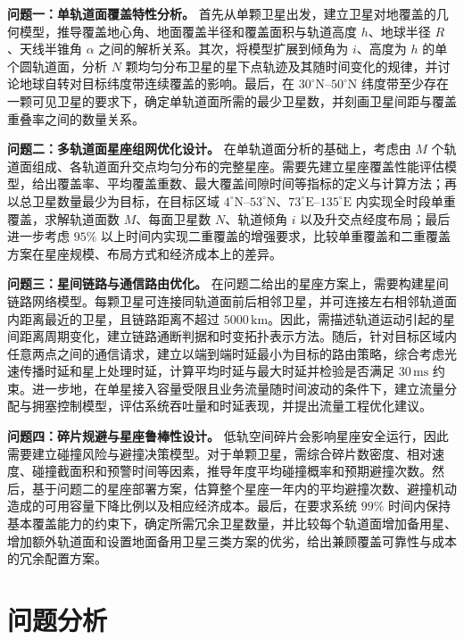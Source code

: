 \documentclass[withoutpreface,bwprint]{cumcmthesis} %
\begin{document}
\textbf{问题一：单轨道面覆盖特性分析。}
首先从单颗卫星出发，建立卫星对地覆盖的几何模型，推导覆盖地心角、地面覆盖半径和覆盖面积与轨道高度 $h$、地球半径 $R$、天线半锥角 $\alpha$ 之间的解析关系。其次，将模型扩展到倾角为 $i$、高度为 $h$ 的单个圆轨道面，分析 $N$ 颗均匀分布卫星的星下点轨迹及其随时间变化的规律，并讨论地球自转对目标纬度带连续覆盖的影响。最后，在 $30^\circ\mathrm{N}$--$50^\circ\mathrm{N}$ 纬度带至少存在一颗可见卫星的要求下，确定单轨道面所需的最少卫星数，并刻画卫星间距与覆盖重叠率之间的数量关系。\par

\textbf{问题二：多轨道面星座组网优化设计。}
在单轨道面分析的基础上，考虑由 $M$ 个轨道面组成、各轨道面升交点均匀分布的完整星座。需要先建立星座覆盖性能评估模型，给出覆盖率、平均覆盖重数、最大覆盖间隙时间等指标的定义与计算方法；再以总卫星数量最少为目标，在目标区域 $4^\circ\mathrm{N}$--$53^\circ\mathrm{N}$、$73^\circ\mathrm{E}$--$135^\circ\mathrm{E}$ 内实现全时段单重覆盖，求解轨道面数 $M$、每面卫星数 $N$、轨道倾角 $i$ 以及升交点经度布局；最后进一步考虑 $95\%$ 以上时间内实现二重覆盖的增强要求，比较单重覆盖和二重覆盖方案在星座规模、布局方式和经济成本上的差异。\par

\textbf{问题三：星间链路与通信路由优化。}
在问题二给出的星座方案上，需要构建星间链路网络模型。每颗卫星可连接同轨道面前后相邻卫星，并可连接左右相邻轨道面内距离最近的卫星，且链路距离不超过 $5000\,\mathrm{km}$。因此，需描述轨道运动引起的星间距离周期变化，建立链路通断判据和时变拓扑表示方法。随后，针对目标区域内任意两点之间的通信请求，建立以端到端时延最小为目标的路由策略，综合考虑光速传播时延和星上处理时延，计算平均时延与最大时延并检验是否满足 $30\,\mathrm{ms}$ 约束。进一步地，在单星接入容量受限且业务流量随时间波动的条件下，建立流量分配与拥塞控制模型，评估系统吞吐量和时延表现，并提出流量工程优化建议。\par

\textbf{问题四：碎片规避与星座鲁棒性设计。}
低轨空间碎片会影响星座安全运行，因此需要建立碰撞风险与避撞决策模型。对于单颗卫星，需综合碎片数密度、相对速度、碰撞截面积和预警时间等因素，推导年度平均碰撞概率和预期避撞次数。然后，基于问题二的星座部署方案，估算整个星座一年内的平均避撞次数、避撞机动造成的可用容量下降比例以及相应经济成本。最后，在要求系统 $99\%$ 时间内保持基本覆盖能力的约束下，确定所需冗余卫星数量，并比较每个轨道面增加备用星、增加额外轨道面和设置地面备用卫星三类方案的优劣，给出兼顾覆盖可靠性与成本的冗余配置方案。\par


\section{问题分析}
\end{document}
